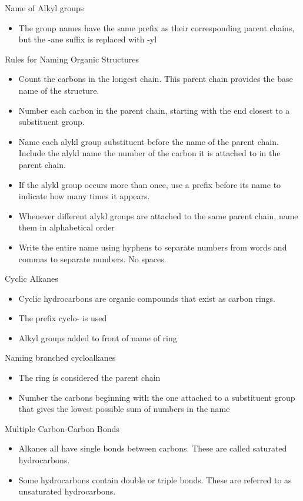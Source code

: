 \documentclass[../hchem.tex]{subfiles}
\begin{document}
Name of Alkyl groups 
\begin{itemize}
    \item The group names have the same prefix as their corresponding parent chains, but the -ane suffix is replaced with -yl
\end{itemize}

Rules for Naming Organic Structures 
\begin{itemize}
    \item Count the carbons in the longest chain. This parent chain provides the base name of the structure.
    \item Number each carbon in the parent chain, starting with the end closest to a substituent group.
    \item Name each alykl group substituent before the name of the parent chain. Include the alykl name the number of the carbon it is attached to in the parent chain.
    \item If the alykl group occurs more than once, use a prefix before its name to indicate how many times it appears.
    \item Whenever different alykl groups are attached to the same parent chain, name them in alphabetical order 
    \item Write the entire name using hyphens to separate numbers from words and commas to separate numbers. No spaces.
\end{itemize}

Cyclic Alkanes 
\begin{itemize}
    \item Cyclic hydrocarbons are organic compounds that exist as carbon rings. 
    \item The prefix cyclo- is used 
    \item Alkyl groups added to front of name of ring 
\end{itemize}

Naming branched cycloalkanes
\begin{itemize}
    \item The ring is considered the parent chain 
    \item Number the carbons beginning with the one attached to a substituent group that gives the lowest possible sum of numbers in the name
\end{itemize}

Multiple Carbon-Carbon Bonds 
\begin{itemize}
    \item Alkanes all have single bonds between carbons. These are called saturated hydrocarbons.
    \item Some hydrocarbons contain double or triple bonds. These are referred to as unsaturated hydrocarbons.
\end{itemize}
\end{document}
